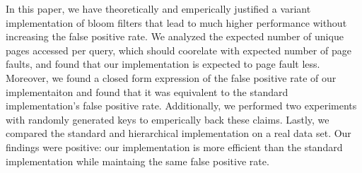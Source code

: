In this paper, we have theoretically and emperically justified a variant implementation of bloom filters
that lead to much higher performance without increasing the false positive rate.
We analyzed the expected number of unique pages accessed per query, which should coorelate with expected number of page faults, and found that our implementation is expected to page fault less.
Moreover, we found a closed form expression of the false positive rate of our implementaiton and found that it was equivalent to the standard implementation's false positive rate.
Additionally, we performed two experiments with randomly generated keys to emperically back these claims.
Lastly, we compared the standard and hierarchical implementation on a real data set.
Our findings were positive: our implementation is more efficient than the standard implementation while maintaing the same false positive rate.